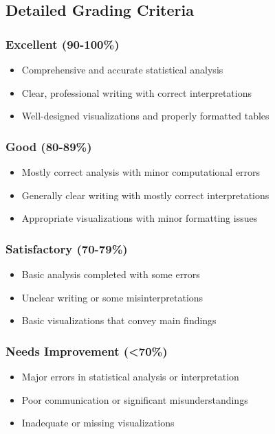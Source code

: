 \documentclass[11pt]{article}
\begin{document}
\subsection{Detailed Grading Criteria}

\subsubsection{Excellent (90-100\%)}
\begin{itemize}
\item Comprehensive and accurate statistical analysis
\item Clear, professional writing with correct interpretations
\item Well-designed visualizations and properly formatted tables
\end{itemize}

\subsubsection{Good (80-89\%)}
\begin{itemize}
\item Mostly correct analysis with minor computational errors
\item Generally clear writing with mostly correct interpretations
\item Appropriate visualizations with minor formatting issues
\end{itemize}

\subsubsection{Satisfactory (70-79\%)}
\begin{itemize}
\item Basic analysis completed with some errors
\item Unclear writing or some misinterpretations
\item Basic visualizations that convey main findings
\end{itemize}

\subsubsection{Needs Improvement (<70\%)}
\begin{itemize}
\item Major errors in statistical analysis or interpretation
\item Poor communication or significant misunderstandings
\item Inadequate or missing visualizations
\end{itemize}
\end{document}
